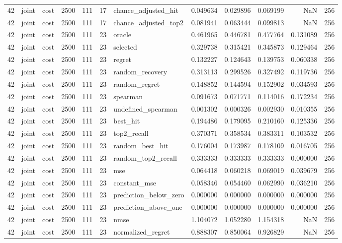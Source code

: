 \begin{tabular}{rllrrrlrrrrr}
42 & joint & cost & 2500 & 111 & 17 & chance_adjusted_hit & 0.049634 & 0.029896 & 0.069199 & NaN & 256 \\
42 & joint & cost & 2500 & 111 & 17 & chance_adjusted_top2 & 0.081941 & 0.063444 & 0.099813 & NaN & 256 \\
42 & joint & cost & 2500 & 111 & 23 & oracle & 0.461965 & 0.446781 & 0.477764 & 0.131089 & 256 \\
42 & joint & cost & 2500 & 111 & 23 & selected & 0.329738 & 0.315421 & 0.345873 & 0.129464 & 256 \\
42 & joint & cost & 2500 & 111 & 23 & regret & 0.132227 & 0.124643 & 0.139753 & 0.060338 & 256 \\
42 & joint & cost & 2500 & 111 & 23 & random_recovery & 0.313113 & 0.299526 & 0.327492 & 0.119736 & 256 \\
42 & joint & cost & 2500 & 111 & 23 & random_regret & 0.148852 & 0.144594 & 0.152902 & 0.034593 & 256 \\
42 & joint & cost & 2500 & 111 & 23 & spearman & 0.091673 & 0.071771 & 0.114016 & 0.172234 & 256 \\
42 & joint & cost & 2500 & 111 & 23 & undefined_spearman & 0.001302 & 0.000326 & 0.002930 & 0.010355 & 256 \\
42 & joint & cost & 2500 & 111 & 23 & best_hit & 0.194486 & 0.179095 & 0.210160 & 0.125336 & 256 \\
42 & joint & cost & 2500 & 111 & 23 & top2_recall & 0.370371 & 0.358534 & 0.383311 & 0.103532 & 256 \\
42 & joint & cost & 2500 & 111 & 23 & random_best_hit & 0.176004 & 0.173987 & 0.178109 & 0.016705 & 256 \\
42 & joint & cost & 2500 & 111 & 23 & random_top2_recall & 0.333333 & 0.333333 & 0.333333 & 0.000000 & 256 \\
42 & joint & cost & 2500 & 111 & 23 & mse & 0.064418 & 0.060218 & 0.069019 & 0.039679 & 256 \\
42 & joint & cost & 2500 & 111 & 23 & constant_mse & 0.058346 & 0.054460 & 0.062990 & 0.036210 & 256 \\
42 & joint & cost & 2500 & 111 & 23 & prediction_below_zero & 0.000000 & 0.000000 & 0.000000 & 0.000000 & 256 \\
42 & joint & cost & 2500 & 111 & 23 & prediction_above_one & 0.000000 & 0.000000 & 0.000000 & 0.000000 & 256 \\
42 & joint & cost & 2500 & 111 & 23 & nmse & 1.104072 & 1.052280 & 1.154318 & NaN & 256 \\
42 & joint & cost & 2500 & 111 & 23 & normalized_regret & 0.888307 & 0.850064 & 0.926829 & NaN & 256 \\

\end{tabular}

